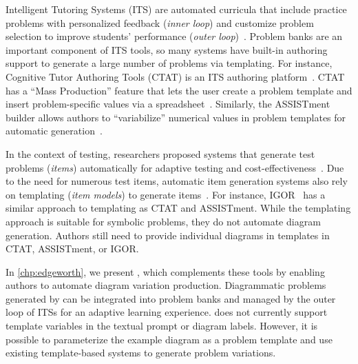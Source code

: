 Intelligent Tutoring Systems (ITS) are automated curricula that include practice problems with personalized feedback (\emph{inner loop}) and customize problem selection to improve students' performance (\emph{outer loop})~\cite{vanlehn_behavior_2006}. Problem banks are an important component of ITS tools, so many systems have built-in authoring support to generate a large number of problems via templating. For instance, Cognitive Tutor Authoring Tools (CTAT) is an ITS authoring platform~\cite{aleven_cognitive_2006}. CTAT has a ``Mass Production'' feature that lets the user create a problem template and insert problem-specific values via a spreadsheet~\cite{aleven_rapid_2006}. Similarly, the ASSISTment builder allows authors to ``variabilize'' numerical values in problem templates for automatic generation~\cite{ASSISTment}.  

In the context of testing, researchers proposed systems that generate test problems (\emph{items}) automatically for adaptive testing and cost-effectiveness~\cite{gierl2012automatic}.  Due to the need for numerous test items, automatic item generation systems also rely on templating (\emph{item models}) to generate items~\cite{gierl_role_2012,HOLLING200971,CheckIt}. For instance, IGOR~\cite[Chapter~13]{gierl2012automatic} has a similar approach to templating as CTAT and ASSISTment. While the templating approach is suitable for symbolic problems, they do not automate diagram generation. Authors still need to provide individual diagrams in templates in CTAT, ASSISTment, or IGOR. 

In \cref{chp:edgeworth}, we present \Edgeworth, which complements these tools by enabling authors to automate diagram variation production. Diagrammatic problems generated by \Edgeworth can be integrated into problem banks and managed by the outer loop of ITSs for an adaptive learning experience. \Edgeworth does not currently support template variables in the textual prompt or diagram labels. However, it is possible to parameterize the example diagram as a problem template and use existing template-based systems to generate problem variations. 

